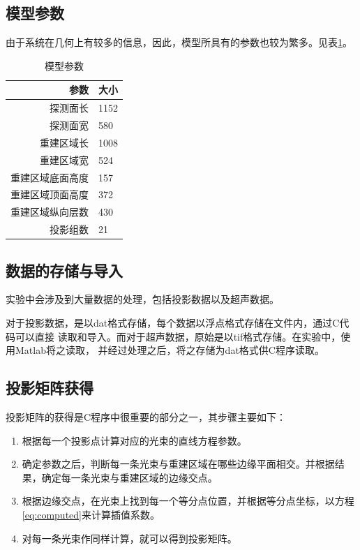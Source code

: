 \subsection{模型参数}
由于系统在几何上有较多的信息，因此，模型所具有的参数也较为繁多。见表\ref{tab:para}。
\begin{table}[!h]
\center
\caption{模型参数}\label{tab:para}
\vspace{1pc}
\begin{tabular}{r|l}
\hline
参数        &     大小\\
\hline
探测面长     &   1152   \\
\hline
探测面宽    &     580 \\
\hline
重建区域长   &   1008 \\
\hline
重建区域宽  &  524 \\
\hline
重建区域底面高度  &   157  \\
\hline
重建区域顶面高度  &   372   \\
\hline
重建区域纵向层数  &  430   \\
\hline
投影组数       &  21 \\
\hline
\end{tabular}
\end{table}
\subsection{数据的存储与导入}
实验中会涉及到大量数据的处理，包括投影数据以及超声数据。

对于投影数据，是以dat格式存储，每个数据以浮点格式存储在文件内，通过C代码可以直接
读取和导入。而对于超声数据，原始是以tif格式存储。在实验中，使用Matlab将之读取，
并经过处理之后，将之存储为dat格式供C程序读取。
\subsection{投影矩阵获得}
投影矩阵的获得是C程序中很重要的部分之一，其步骤主要如下：
\begin{enumerate}
\item 根据每一个投影点计算对应的光束的直线方程参数。
\item 确定参数之后，判断每一条光束与重建区域在哪些边缘平面相交。并根据结果，确定每一条光束与重建区域的边缘交点。
\item 根据边缘交点，在光束上找到每一个等分点位置，并根据等分点坐标，以方程\eqref{eq:computed}来计算插值系数。
\item 对每一条光束作同样计算，就可以得到投影矩阵。
\end{enumerate}
